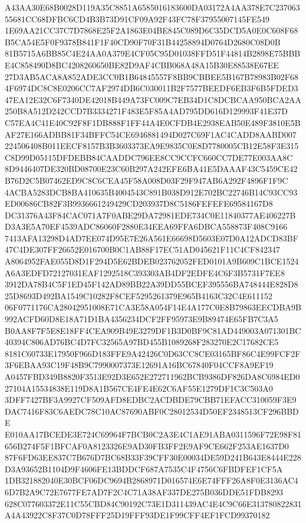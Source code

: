 \documentclass[UTF8,fontset=fandol,zihao=-4,a4paper]{ctexart}
\begin{document}
{{A43AA30E68B0028D119A35C8851A6585016183600DA03172A4AA378E7C23706355681CC68DFBC6CD4B3B73D91CF09A92F43FC78F37955007145FE549
1E69AA21CC37C7D7868E25F2A1863E04BE845C089D6C35DCD5A0E0C608F68B5CA54E5F0F9378B841F1F40CD90F70F31B44258894D0764D2680C08D0B
81B5715A6BB85C4E24AA0A379E4CF05C95D01038FFD51F44814B2898E75BBBE4C858490D8BC4208260650BE82D9AF4CBB068A48A15B30E88538E67EE
27D3AB5ACA8A852ADE3CC0B1B64845557F8BB9CBBEE5B167B78983B02F684F6974DC8C8E0206CC7AF2974DB6C030011B2F7577BEEDF6EB3F6B5FDED3
47EA12E32C6F7340DE42018B449A73FC009C7EB34D1C8DCBCAA950BCA2AA250B8A512D242CCD7B3334271F483E5F85A4AD795DD616D129993F41E37D
C57EA4C41E40C92F8F1DB888F1FF44A4E0CFDB4E2938EAB50E489F3810E5BAF27E166ADBB81F34BFFC54CE6946881494D027C69F1AC4CADD8AABD007
224506408B011EECF8157B3B3603373EA9E9835C0E8D7780005CB12E58F3E315C8D99D05115DFDEBB84CAADDC796EE8CC9CCFC660CC7DE77E003AA8C
8D9446407DE320BD08700E23C60B297A242EFE6BA41E5DAAAF43C5459CE42B76D2C5B07462ED9C8C6CEA45F58A008D03F29F947AB6A292F4896F1F9C
4ACBA5283DCB8BA410635B4004543C891B038D912E702BC22746B14C93CC93ED00686CB82F3B9936661249429CD203937D8C5186FEFEFE69584167D8
DC31376A43F84CAC071A7F0ABE29DA72981EDE734C0E11840377AE406227BD3A3E5A70EF4539ADC86060F2880E34EEA69FFA6DBCA558873F408C9166
7413AFA13298D4AD7EE074D95E7E26A561E66698D5603E07D0A12ADCD83BF47C4DE307FF26652E016700B0C1AB88F17EC51AD045621F11C4CF842347
A8064952FAE055D8D1F294D5E62BDEB023762052FED0101A9B609C1BCE1524A6A3EDFD72127031EAF1292518C393303AB4DF2EDFE4C6F3B5731F7EE8
3912DA78B4C5F1ED45F142AD89BB22A39DD55BCEF395556BA748444E828D825D8693D492BA1549C10282F8CEF5295261379E965B4163C32C4E611152
06F0771176CA28042951008E71CA3E58A054F14E4A177C0E8B79863EECDBA9B992ACFD60D8E18A71D1BA4356234DCF2FF95973E9B89474E65FB7C3A5
B0AA8F7F5E8E18FF4CEA909B49E3279DF1B3D0BF9C81AD449003A071301BC40394C806AD76BC4D7FC32565A97BD455B1089268F283270E2C17682CE5
8181C60733E17950F966D183FFE9A42426C0D63CC8CE03165BF86C4E99FCF2F3F6EBAA93C19F48B9C7990007373E12691A16BC67840F04CCF8A9EF19
A0457FBD349B8820F3513E92D3E652E272711962BCB9386DF826DA8C6984ED027104A15534838E119D8A1B567CE4FE4E62C6AF55E1279DF1C3C503A0
3DFF7427BF3A9927CF509AFD8EDBC2ACDBDE79CBB71EFACC310059F3E9DAC7416F83C6AEDC78C10AC87690ABF0C28012534D50EF2348513CF296BBDE
E010AA17BCEDE3E724C69964F7BCB0C2A3E4C1AE91ABA0311596F72E98F81656B274F5F1BFCAF0A8123326E9AD30FB3FF2E9AF9CE662F253AE1637D0
87F6FD63EE837C7B676D7BC68B33F39CFF30E00034DE59D241B643E8444E228D3A93652B1104D9F4606FE13BDDCF687A7535C4F4756C6FBDFEF1CF5A
1DB321882040E30BCF06DC9694B2868971D016574E6E74FFF26A8F0E3136AC46D7B2A9C72E7677FE7AD7F2C4C71A38AF337DE275B036DDE51FDB8293
628C077603372E11C55CBD84C90192C73E1D311439AC4E4C9C66E313780822831A4A43922C8F37C0D78FFF25D19FFF93DE1F99CFF4EF1FCD99370182
}}
\end{document}
